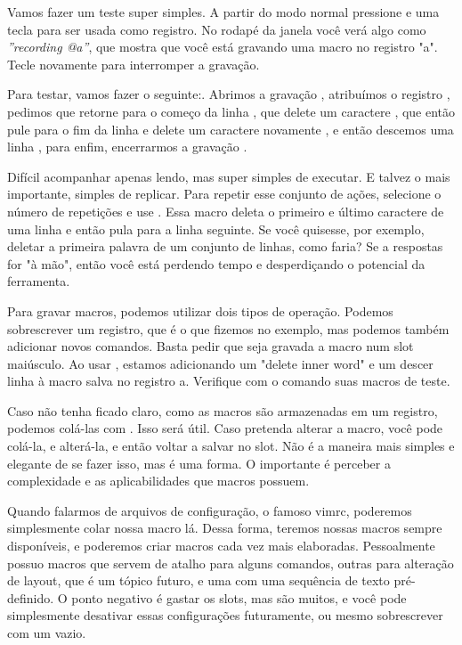 Vamos fazer um teste super simples.
A partir do modo normal pressione  e uma tecla para ser usada como registro.
No rodapé da janela você verá algo como \textit{''recording @a''}, que mostra que você está gravando
uma macro no registro "a".
Tecle novamente  para interromper a gravação.

Para testar, vamos fazer o seguinte:.
Abrimos a gravação , atribuímos o registro ,
pedimos que retorne para o começo da linha , que delete um caractere
, que então pule para o fim da linha \vimcommand{\$}
e delete um caractere novamente , e então descemos uma linha ,
para enfim, encerrarmos a gravação .

Difícil acompanhar apenas lendo, mas super simples de executar.
E talvez o mais importante, simples de replicar.
Para repetir esse conjunto de ações, selecione o número de repetições e use .
Essa macro deleta o primeiro e último caractere de uma linha e então pula para a linha seguinte.
Se você quisesse, por exemplo, deletar a primeira palavra de um conjunto de linhas, como faria?
Se a respostas for "à mão", então você está perdendo tempo e desperdiçando o potencial da ferramenta.

Para gravar macros, podemos utilizar dois tipos de operação.
Podemos sobrescrever um registro, que é o que fizemos no exemplo, mas podemos também adicionar novos comandos.
Basta pedir que seja gravada a macro num slot maiúsculo.
Ao usar , estamos adicionando um "delete inner word" e um descer linha à macro salva no registro a.
Verifique com o comando  suas macros de teste.

Caso não tenha ficado claro, como as macros são armazenadas em um registro, podemos colá-las com .
Isso será útil.
Caso pretenda alterar a macro, você pode colá-la, e alterá-la, e então voltar a salvar no slot.
Não é a maneira mais simples e elegante de se fazer isso, mas é uma forma.
O importante é perceber a complexidade e as aplicabilidades que macros possuem.

Quando falarmos de arquivos de configuração, o famoso vimrc, poderemos simplesmente colar nossa macro lá.
Dessa forma, teremos nossas macros sempre disponíveis, e poderemos criar macros cada vez mais elaboradas.
Pessoalmente possuo macros que servem de atalho para alguns comandos, outras para alteração de layout,
que é um tópico futuro, e uma com uma sequência de texto pré-definido.
O ponto negativo é gastar os slots, mas são muitos, e você pode simplesmente desativar essas configurações
futuramente, ou mesmo sobrescrever com um vazio.

